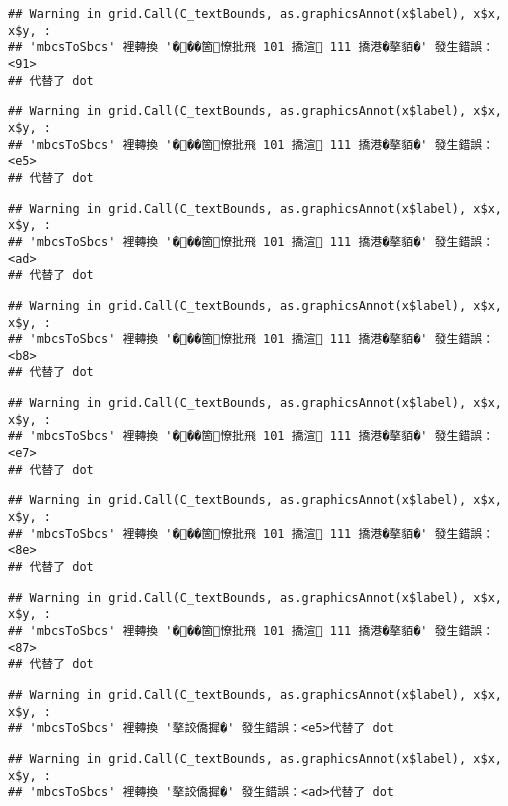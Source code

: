 \documentclass[
]{article}
\begin{document}
\begin{verbatim}
## Warning in grid.Call(C_textBounds, as.graphicsAnnot(x$label), x$x, x$y, :
## 'mbcsToSbcs' 裡轉換 '���箇憭批飛 101 撟渲 111 撟港�摮貊�' 發生錯誤：<91>
## 代替了 dot
\end{verbatim}

\begin{verbatim}
## Warning in grid.Call(C_textBounds, as.graphicsAnnot(x$label), x$x, x$y, :
## 'mbcsToSbcs' 裡轉換 '���箇憭批飛 101 撟渲 111 撟港�摮貊�' 發生錯誤：<e5>
## 代替了 dot
\end{verbatim}

\begin{verbatim}
## Warning in grid.Call(C_textBounds, as.graphicsAnnot(x$label), x$x, x$y, :
## 'mbcsToSbcs' 裡轉換 '���箇憭批飛 101 撟渲 111 撟港�摮貊�' 發生錯誤：<ad>
## 代替了 dot
\end{verbatim}

\begin{verbatim}
## Warning in grid.Call(C_textBounds, as.graphicsAnnot(x$label), x$x, x$y, :
## 'mbcsToSbcs' 裡轉換 '���箇憭批飛 101 撟渲 111 撟港�摮貊�' 發生錯誤：<b8>
## 代替了 dot
\end{verbatim}

\begin{verbatim}
## Warning in grid.Call(C_textBounds, as.graphicsAnnot(x$label), x$x, x$y, :
## 'mbcsToSbcs' 裡轉換 '���箇憭批飛 101 撟渲 111 撟港�摮貊�' 發生錯誤：<e7>
## 代替了 dot
\end{verbatim}

\begin{verbatim}
## Warning in grid.Call(C_textBounds, as.graphicsAnnot(x$label), x$x, x$y, :
## 'mbcsToSbcs' 裡轉換 '���箇憭批飛 101 撟渲 111 撟港�摮貊�' 發生錯誤：<8e>
## 代替了 dot
\end{verbatim}

\begin{verbatim}
## Warning in grid.Call(C_textBounds, as.graphicsAnnot(x$label), x$x, x$y, :
## 'mbcsToSbcs' 裡轉換 '���箇憭批飛 101 撟渲 111 撟港�摮貊�' 發生錯誤：<87>
## 代替了 dot
\end{verbatim}

\begin{verbatim}
## Warning in grid.Call(C_textBounds, as.graphicsAnnot(x$label), x$x, x$y, :
## 'mbcsToSbcs' 裡轉換 '摮詨僑摨�' 發生錯誤：<e5>代替了 dot
\end{verbatim}

\begin{verbatim}
## Warning in grid.Call(C_textBounds, as.graphicsAnnot(x$label), x$x, x$y, :
## 'mbcsToSbcs' 裡轉換 '摮詨僑摨�' 發生錯誤：<ad>代替了 dot
\end{verbatim}
\end{document}
